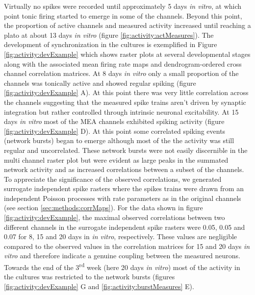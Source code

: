     Virtually no spikes were recorded until approximately 5 days \textit{in vitro}, at which point tonic firing started to emerge in some of the channels. Beyond this point, the proportion of active channels and measured activity increased until reaching a plato at about 13 days \textit{in vitro} (figure \ref{fig:activity:actMeasures}). The development of synchronization in the cultures is exemplified in Figure \ref{fig:activity:devExample} which shows raster plots at several developmental stages along with the associated mean firing rate maps and dendrogram-ordered cross channel correlation matrices. At 8 days \textit{in vitro} only a small proportion of the channels was tonically active and showed regular spiking (figure \ref{fig:activity:devExample} A). At this point there was very little correlation across the channels suggesting that the measured spike trains aren't driven by synaptic integration but rather controlled through intrinsic neuronal excitability. At 15 days \textit{in vitro} most of the MEA channels exhibited spiking activity (figure \ref{fig:activity:devExample} D). At this point some correlated spiking events (network bursts) began to emerge although most of the the activity was still regular and uncorrelated. These network bursts were not easily discernible in the multi channel raster plot but were evident as large peaks in the summated network activity and as increased correlations between a subset of the channels. To appreciate the significance of the observed correlations, we generated surrogate independent spike rasters where the spikes trains were drawn from an independent Poisson processes with rate parameters as in the original channels (see section \ref{sec:methods:corrMaps}). For the data shown in figure \ref{fig:activity:devExample}, the maximal observed correlations between two different channels in the surrogate independent spike rasters were 0.05, 0.05 and 0.07 for 8, 15 and 20 days in \textit{in vitro}, respectively. These values are negligible compared to the observed values in the correlation matrices for 15 and 20 days \textit{in vitro} and therefore indicate a genuine coupling between the measured neurons. Towards the end of the 3\textsuperscript{rd} week (here 20 days \textit{in vitro}) most of the activity in the cultures was restricted to the network bursts (figures \ref{fig:activity:devExample} G and \ref{fig:activity:burstMeasures} E).

